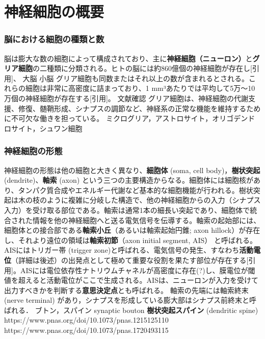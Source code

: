 \section{神経細胞の概要}
\subsubsection{脳における細胞の種類と数}
脳は膨大な数の細胞によって構成されており、主に\textbf{神経細胞（ニューロン）}と\textbf{グリア細胞}の二種類に分類される。ヒトの脳には約860億個の神経細胞が存在し[引用]、
大脳
小脳
グリア細胞も同数またはそれ以上の数が含まれるとされる。これらの細胞は非常に高密度に詰まっており、1 mm³あたりでは平均して5万〜10万個の神経細胞が存在する[引用]。
文献確認
グリア細胞は、神経細胞の代謝支援、修復、髄鞘形成、シナプスの調節など、神経系の正常な機能を維持するために不可欠な働きを担っている。
ミクログリア，アストロサイト，オリゴデンドロサイト，シュワン細胞
\subsubsection{神経細胞の形態}
神経細胞の形態は他の細胞と大きく異なり、\textbf{細胞体} (soma, cell body)，\textbf{樹状突起}(dendrite)、\textbf{軸索} (axon) という三つの主要構造からなる。細胞体には細胞核があり、タンパク質合成やエネルギー代謝など基本的な細胞機能が行われる。樹状突起は木の枝のように複雑に分岐した構造で、他の神経細胞からの入力（シナプス入力）を受け取る部位である。軸索は通常1本の細長い突起であり、細胞体で統合された情報を他の神経細胞へと送る電気信号を伝導する。軸索の起始部には、細胞体との接合部である\textbf{軸索小丘}（あるいは軸索起始円錐; axon hillock）が存在し、それより遠位の領域は\textbf{軸索初節}（axon initial segment, AIS） と呼ばれる。AISにはトリガー帯 (trigger zone)と呼ばれる、電気信号の発生、すなわち\textbf{活動電位}（詳細は後述）の出発点として極めて重要な役割を果たす部位が存在する[引用]。AISには電位依存性ナトリウムチャネルが高密度に存在(?)し、膜電位が閾値を超えると活動電位がここで生成される。AISは、ニューロンが入力を受けて出力すべきかを判断する\textbf{意思決定点}とも呼ばれる。
軸索の先端には軸索終末 (nerve terminal) があり，シナプスを形成している膨大部はシナプス前終末と呼ばれる．
ブトン，スパイン
synaptic bouton
\textbf{樹状突起スパイン} (dendritic spine)
https://www.pnas.org/doi/10.1073/pnas.1215125110
https://www.pnas.org/doi/10.1073/pnas.1720493115
